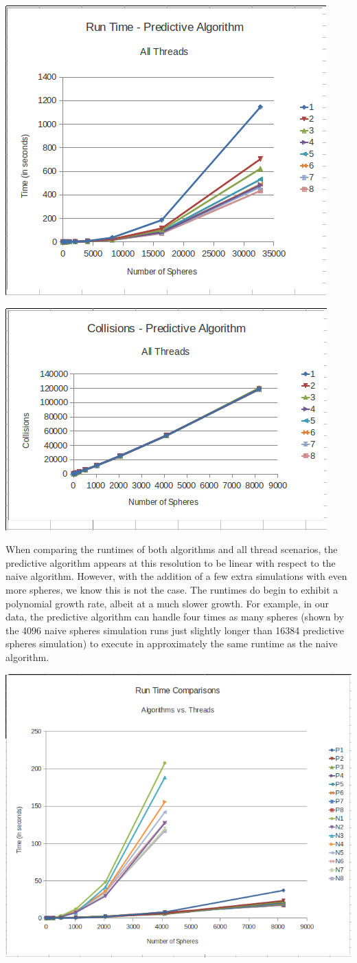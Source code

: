 \documentclass[conference]{IEEEtran}
\begin{document}
\begin{center}
	\includegraphics[width=.45\textwidth]{runtime_predictive_allthreads.png}
\end{center}

\begin{center}
	\includegraphics[width=.45\textwidth]{collisions_predictive_allthreads.png}
\end{center}

When comparing the runtimes of both algorithms and all thread scenarios, the predictive algorithm appears at this resolution to be linear with respect to the naive algorithm.  However, with the addition of a few extra simulations with even more spheres, we know this is not the case.  The runtimes do begin to exhibit a polynomial growth rate, albeit at a much slower growth.  For example, in our data, the predictive algorithm can handle four times as many spheres (shown by the 4096 naive spheres simulation runs just slightly longer than 16384 predictive spheres simulation) to execute in approximately the same runtime as the naive algorithm.

\begin{center}
	\includegraphics[width=.45\textwidth]{runtime_comparison.png}
\end{center}
\end{document}
